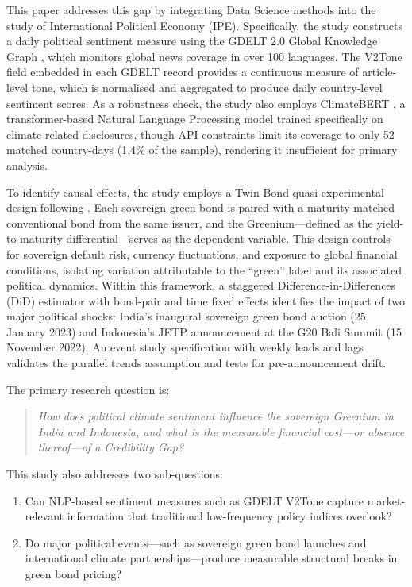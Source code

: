 \documentclass[12pt,a4paper]{article}
\begin{document}
This paper addresses this gap by integrating Data Science methods into the study of International Political Economy (IPE). Specifically, the study constructs a daily political sentiment measure using the GDELT 2.0 Global Knowledge Graph \citep{Leetaru2013}, which monitors global news coverage in over 100 languages. The V2Tone field embedded in each GDELT record provides a continuous measure of article-level tone, which is normalised and aggregated to produce daily country-level sentiment scores. As a robustness check, the study also employs ClimateBERT \citep{Webersinke2022}, a transformer-based Natural Language Processing model trained specifically on climate-related disclosures, though API constraints limit its coverage to only 52 matched country-days (1.4\% of the sample), rendering it insufficient for primary analysis.

To identify causal effects, the study employs a Twin-Bond quasi-experimental design following \citet{Zerbib2019}. Each sovereign green bond is paired with a maturity-matched conventional bond from the same issuer, and the Greenium---defined as the yield-to-maturity differential---serves as the dependent variable. This design controls for sovereign default risk, currency fluctuations, and exposure to global financial conditions, isolating variation attributable to the ``green'' label and its associated political dynamics. Within this framework, a staggered Difference-in-Differences (DiD) estimator with bond-pair and time fixed effects identifies the impact of two major political shocks: India's inaugural sovereign green bond auction (25 January 2023) and Indonesia's JETP announcement at the G20 Bali Summit (15 November 2022). An event study specification with weekly leads and lags validates the parallel trends assumption and tests for pre-announcement drift.


The primary research question is:

\begin{quote}
\textit{How does political climate sentiment influence the sovereign Greenium in India and Indonesia, and what is the measurable financial cost---or absence thereof---of a Credibility Gap?}
\end{quote}

\noindent This study also addresses two sub-questions:

\begin{enumerate}[nosep]
  \item Can NLP-based sentiment measures such as GDELT V2Tone capture market-relevant information that traditional low-frequency policy indices overlook?
  \item Do major political events---such as sovereign green bond launches and international climate partnerships---produce measurable structural breaks in green bond pricing?
\end{enumerate}
\end{document}
